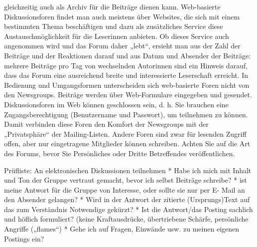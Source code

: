 \documentclass[]{book}
\theoremstyle{definition}
\theoremstyle{definition}
\theoremstyle{definition}
\theoremstyle{remark}
\begin{document}
gleichzeitig auch als Archiv für die Beiträge dienen kann. Web-basierte
Diskussionsforen findet man auch meistens über Websites, die sich mit
einem bestimmten Thema beschäftigen und dazu als zusätzliches Service
diese Austauschmöglichkeit für die Leserinnen anbieten. Ob dieses
Service auch angenommen wird und das Forum daher „lebt``, ersieht man
aus der Zahl der Beiträge und der Reaktionen darauf und aus Datum und
Absender der Beiträge: mehrere Beiträge pro Tag von wechselnden
Autorinnen sind ein Hinweis darauf, dass das Forum eine ausreichend
breite und interessierte Leserschaft erreicht. In Bedienung und
Umgangsformen unterscheiden sich web-basierte Foren nicht von den
Newsgroups. Beiträge werden über Web-Formulare eingegeben und gesendet.
Diskussionsforen im Web können geschlossen sein, d. h. Sie brauchen eine
Zugangsberechtigung (Benutzername und Passwort), um teilnehmen zu
können. Damit verbinden diese Foren den Komfort der Newsgroups mit der
„Privatsphäre`` der Mailing-Listen. Andere Foren sind zwar für lesenden
Zugriff offen, aber nur eingetragene Mitglieder können schreiben. Achten
Sie auf die Art des Forums, bevor Sie Persönliches oder Dritte
Betreffendes veröffentlichen.

Prüfliste: An elektronischen Diskussionen teilnehmen * Habe ich mich mit
Inhalt und Ton der Gruppe vertraut gemacht, bevor ich selbst Beiträge
schreibe? * ist meine Antwort für die Gruppe von Interesse, oder sollte
sie nur per E- Mail an den Absender gelangen? * Wird in der Antwort der
zitierte (Ursprungs)Text auf das zum Verständnis Notwendige gekürzt? *
Ist die Antwort/das Posting sachlich und höflich formuliert? (keine
Kraftausdrücke, übertriebene Schärfe, persönliche Angriffe („flames``) *
Gehe ich auf Fragen, Einwände usw. zu meinen eigenen Postings ein?
\end{document}

